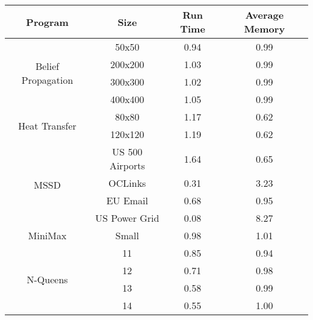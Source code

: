 \begin{tabular}{c | c || c | c} \hline
	\textbf{Program} & \textbf{Size} & \textbf{Run Time} & \textbf{Average Memory}\\ \hline \hline
	\multirow{4}{*}{Belief Propagation}  & 50x50 &  0.94  &  0.99
  \\
		 & 200x200 &  1.03  &  0.99
  \\
		 & 300x300 &  1.02  &  0.99
  \\
		 & 400x400 &  1.05  &  0.99
  \\
	\hline
	\multirow{2}{*}{Heat Transfer}  & 80x80 &  1.17  &  0.62
  \\
		 & 120x120 &  1.19  &  0.62
  \\
	\hline
	\multirow{4}{*}{MSSD}  & US 500 Airports &  1.64  &  0.65
  \\
		 & OCLinks &  0.31  &  3.23
  \\
		 & EU Email &  0.68  &  0.95
  \\
		 & US Power Grid &  0.08  &  8.27
  \\
	\hline
	MiniMax  & Small &  0.98  &  1.01
  \\
	\hline
	\multirow{4}{*}{N-Queens}  & 11 &  0.85  &  0.94
  \\
		 & 12 &  0.71  &  0.98
  \\
		 & 13 &  0.58  &  0.99
  \\
		 & 14 &  0.55  &  1.00
  \\
	\hline
\end{tabular}
